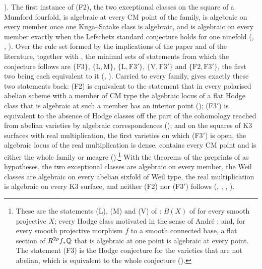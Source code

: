 \begin{theorem}[Closure]
\begin{enumerate}[label=\textup{(\roman*)},leftmargin=2.8em,itemsep=4pt]
  ). The first instance of
  \textup{(F2)}, the two exceptional classes on the square of a Mumford
  fourfold, is algebraic at every CM point of the family, is algebraic on
  every member once one Kuga--Satake class is algebraic, and is algebraic on
  every member exactly when the Lefschetz standard conjecture holds for one
  ninefold (, ,
  ). Over the rule set formed by the implications of
  the paper and of the literature, together with , the
  minimal sets of statements from which the conjecture follows are
  $\{\mathrm{F3}\}$, $\{\mathrm{L},\mathrm{M}\}$,
  $\{\mathrm{L},\mathrm{F3}'\}$, $\{\mathrm{V},\mathrm{F3}'\}$ and
  $\{\mathrm{F2},\mathrm{F3}'\}$, the first two being each equivalent to it
  (, ). Carried to every family,
   gives exactly these two statements back:
  \textup{(F2)} is equivalent to the statement that in every polarised
  abelian scheme with a member of CM type the algebraic locus of a flat
  Hodge class that is algebraic at such a member has an interior point
  (); \textup{(F3$'$)} is equivalent to the absence
  of Hodge classes off the part of the cohomology reached from abelian
  varieties by algebraic correspondences (); and on the
  squares of K3 surfaces with real multiplication, the first varieties on
  which \textup{(F3$'$)} is open, the algebraic locus of the real
  multiplication is dense, contains every CM point and is either the whole
  family or meagre ().\footnote{These are the statements
  \textup{(L)}, \textup{(M)} and \textup{(V)} of : $B(X)$ of
   for every smooth projective $X$; every Hodge class
  motivated in the sense of Andr\'e \cite[\S2.1]{And96b}; and, for every
  smooth projective morphism $f$ to a smooth connected base, a flat section of
  $R^{2p}f_{*}\mathbb{Q}$ that is algebraic at one point is algebraic at every
  point. The statement (F3) is the Hodge conjecture for the varieties that
  are not abelian, which is equivalent to the whole conjecture
  ().}
  With the theorems of the preprints of  as
  hypotheses, the two exceptional classes are algebraic on every member,
  the Weil classes are algebraic on every abelian sixfold of Weil type, the
  real multiplication is algebraic on every K3 surface, and neither
  \textup{(F2)} nor \textup{(F3$'$)} follows (,
  , , ).
\end{enumerate}
\end{theorem}

